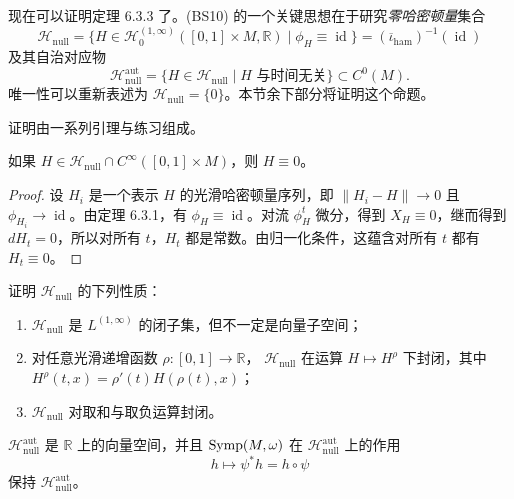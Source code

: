 现在可以证明定理 6.3.3 了。(BS10) 的一个关键思想在于研究\emph{零哈密顿量}集合
\[
 \mathcal H_{\mathrm{null}}
 =\bigl\{H\in\mathcal H_0^{(1,\infty)}([0,1]\times M,\mathbb R)
 \mid\phi_H\equiv\operatorname{id}\bigr\}
 =(\overline\iota_{\mathrm{ham}})^{-1}(\operatorname{id})
\]
及其自治对应物
\[
 \mathcal H_{\mathrm{null}}^{\mathrm{aut}}
 =\{H\in\mathcal H_{\mathrm{null}}\mid H\text{ 与时间无关}\}
 \subset C^0(M).
\]
唯一性可以重新表述为 $\mathcal H_{\mathrm{null}}=\{0\}$。本节余下部分将证明这个命题。

证明由一系列引理与练习组成。

\begin{lemma}\label{lem:smooth-null-hamiltonian-zero}
如果
$H\in\mathcal H_{\mathrm{null}}\cap C^\infty([0,1]\times M)$，则
$H\equiv0$。
\end{lemma}

\begin{proof}
设 $H_i$ 是一个表示 $H$ 的光滑哈密顿量序列，即
$\|H_i-H\|\to0$ 且 $\phi_{H_i}\to\operatorname{id}$。由定理
6.3.1，有 $\phi_H\equiv\operatorname{id}$。对流
$\phi_H^t$ 微分，得到 $X_H\equiv0$，继而得到
$dH_t=0$，所以对所有 $t$，$H_t$ 都是常数。由归一化条件，这蕴含对所有
$t$ 都有 $H_t\equiv0$。
\end{proof}

\begin{exercise}\label{ex:null-hamiltonian-properties}
证明 $\mathcal H_{\mathrm{null}}$ 的下列性质：
\begin{enumerate}[label=(\arabic*)]
 \item $\mathcal H_{\mathrm{null}}$ 是 $L^{(1,\infty)}$ 的闭子集，但不一定是向量子空间；
 \item 对任意光滑递增函数 $\rho:[0,1]\to\mathbb R$，
 $\mathcal H_{\mathrm{null}}$ 在运算 $H\mapsto H^\rho$ 下封闭，其中
 $H^\rho(t,x)=\rho'(t)H(\rho(t),x)$；
 \item $\mathcal H_{\mathrm{null}}$ 对取和与取负运算封闭。
\end{enumerate}
\end{exercise}

\begin{lemma}\label{lem:autonomous-null-hamiltonians-vector-space}
$\mathcal H_{\mathrm{null}}^{\mathrm{aut}}$ 是 $\mathbb R$ 上的向量空间，并且
$\operatorname{Symp}(M,\omega)$ 在 $\mathcal H_{\mathrm{null}}^{\mathrm{aut}}$ 上的作用
\[
 h\longmapsto\psi^*h=h\circ\psi
\]
保持 $\mathcal H_{\mathrm{null}}^{\mathrm{aut}}$。
\end{lemma}

